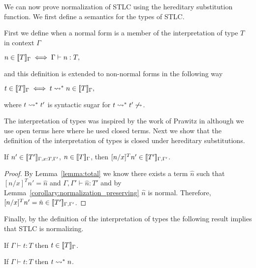 \documentclass{article}
\begin{document}
We can now prove normalization of STLC using the hereditary substitution
function.  We first define a semantics for the types of STLC.
\begin{definition}
  \label{def:interpretation_of_types_stlc}
  First we define when a normal form is a member of the interpretation of type $T$ in context $\Gamma$
  \begin{center}
    \begin{math}
    n \in [\negthinspace[T]\negthinspace]_\Gamma \iff \Gamma \vdash n:T,
  \end{math}
  \end{center}
  and this definition is extended to non-normal forms in the following way
  \begin{center}
    \begin{math}
    t \in [\negthinspace[T]\negthinspace]_\Gamma \iff t \rightsquigarrow^{*} n \in [\negthinspace[T]\negthinspace]_\Gamma,
  \end{math}
  \end{center}
  where $t \rightsquigarrow^{*} t'$ is syntactic sugar for $t \rightsquigarrow^* t' \not \rightsquigarrow$.
\end{definition}
\noindent 
The interpretation of types was inspired by the work of Prawitz in
\cite{Prawitz:2005} although we use open terms here where he used
closed terms.  Next we show that the definition of the interpretation
of types is closed under hereditary substitutions.
\begin{lemma}
  If $n' \in [\negthinspace[T']\negthinspace]_{\Gamma,x:T,\Gamma'}$, $n \in [\negthinspace[T]\negthinspace]_\Gamma$, then 
  $[n/x]^T n' \in [\negthinspace[T']\negthinspace]_{\Gamma,\Gamma'}$.
  
  \label{lemma:interpretation_of_types_closed_substitution_stlc}
\end{lemma}
\begin{proof}
  By Lemma~\ref{lemma:total} we know there exists a term $\hat{n}$ 
  such that $[n/x]^T n' = \hat{n}$ and $\Gamma,\Gamma' \vdash \hat{n}:T'$ and by 
  Lemma~\ref{corollary:normalization_preserving} $\hat{n}$ is normal.  Therefore,
  $[n/x]^T n' = \hat{n} \in [\negthinspace[T']\negthinspace]_{\Gamma,\Gamma'}$.
\end{proof}
\noindent
Finally, by the definition of the interpretation of types the
following result implies that STLC is normalizing.
\begin{thm}
  If $\Gamma \vdash t:T$ then $t \in [\negthinspace[T]\negthinspace]_\Gamma$.
  \label{thm:soundness_stlc}
\end{thm}

\begin{corollary}
  If $\Gamma \vdash t:T$ then $t \rightsquigarrow^{*} n$.
\end{corollary}
\end{document}
